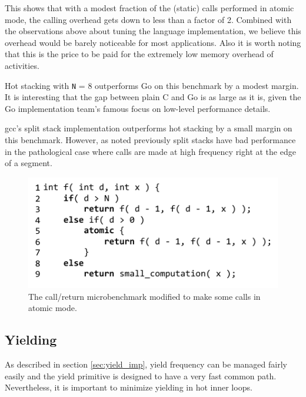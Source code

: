 \documentclass[sigplan,10pt,review,anonymous]{acmart}\settopmatter{printfolios=true,printccs=false,printacmref=false}
\begin{document}

This shows that with a modest fraction of the (static) calls performed in atomic mode, the calling overhead gets down to less than a factor of 2.
Combined with the observations above about tuning the language implementation, we believe this overhead would be barely noticeable for most applications.
Also it is worth noting that this is the price to be paid for the extremely low memory overhead of activities.

Hot stacking with \texttt{N} = 8 outperforms Go on this benchmark by a modest margin.
It is interesting that the gap between plain C and Go is as large as it is, given the Go implementation team's famous focus on low-level performance details.

gcc's split stack implementation outperforms hot stacking by a small margin on this benchmark.
However, as noted previously split stacks have bad performance in the pathological case where calls are made at high frequency right at the edge of a segment.

\begin{figure}
\includegraphics{just_calling_n_benchmark}
\caption{The call/return microbenchmark modified to make some calls in atomic mode.}
\label{fig:micro_calling_n}
\end{figure}

\subsection{Yielding}

As described in section \ref{sec:yield_imp}, yield frequency can be managed fairly easily and the yield primitive is designed to have a very fast common path.
Nevertheless, it is important to minimize yielding in hot inner loops.
\end{document}
